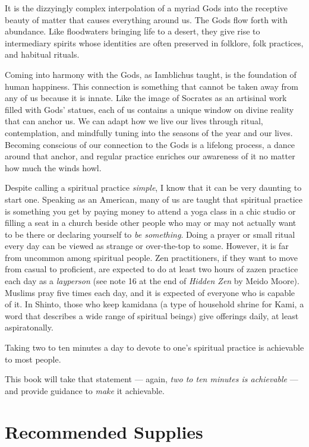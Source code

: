 \documentclass[
]{book}
\begin{document}
It is the dizzyingly complex interpolation of a myriad Gods into the receptive beauty of matter that causes everything around us. The Gods flow forth with abundance. Like floodwaters bringing life to a desert, they give rise to intermediary spirits whose identities are often preserved in folklore, folk practices, and habitual rituals.

Coming into harmony with the Gods, as Iamblichus taught, is the foundation of human happiness. This connection is something that cannot be taken away from any of us because it is innate. Like the image of Socrates as an artisinal work filled with Gods' statues, each of us contains a unique window on divine reality that can anchor us. We can adapt how we live our lives through ritual, contemplation, and mindfully tuning into the seasons of the year and our lives. Becoming conscious of our connection to the Gods is a lifelong process, a dance around that anchor, and regular practice enriches our awareness of it no matter how much the winds howl.

Despite calling a spiritual practice \emph{simple}, I know that it can be very daunting to start one. Speaking as an American, many of us are taught that spiritual practice is something you get by paying money to attend a yoga class in a chic studio or filling a seat in a church beside other people who may or may not actually want to be there or declaring yourself to \emph{be something}. Doing a prayer or small ritual every day can be viewed as strange or over-the-top to some. However, it is far from uncommon among spiritual people. Zen practitioners, if they want to move from casual to proficient, are expected to do at least two hours of zazen practice each day as a \emph{layperson} (see note 16 at the end of \emph{Hidden Zen} by Meido Moore). Muslims pray five times each day, and it is expected of everyone who is capable of it. In Shinto, those who keep kamidana (a type of household shrine for Kami, a word that describes a wide range of spiritual beings) give offerings daily, at least aspiratonally.

Taking two to ten minutes a day to devote to one's spiritual practice is achievable to most people.

This book will take that statement --- again, \emph{two to ten minutes is achievable} --- and provide guidance to \emph{make} it achievable.

\hypertarget{recommended-supplies}{%
\section{Recommended Supplies}\label{recommended-supplies}}
\end{document}

